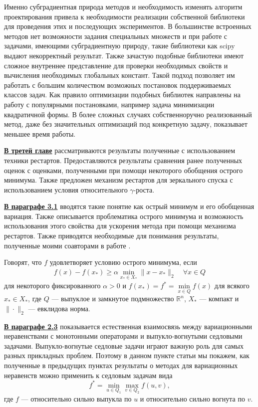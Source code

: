 Именно субградиентная природа методов и необходимость изменять алгоритм проектирования привела к необходимости реализации собственной библиотеки для проведения этих и последующих экспериментов. В большинстве встроенных методов нет возможности задания специальных  множеств и при работе с задачами, имеющими субградиентную природу, такие библиотеки как scipy выдают некорректный результат. Также зачастую подобные библиотеки имеют сложное внутреннее представление для проверки необходимых свойств и вычисления необходимых глобальных констант. Такой подход позволяет им работать с большим количеством возможных постановок поддерживаемых классов задач. Как правило оптимизации подобных библиотек направлены на работу с популярными постановками, например задача минимизации квадратичной формы. В более сложных случаях собственноручно реализованный метод, даже без значительных оптимизаций под конкретную задачу, показывает меньшее время работы. 


\underline{\textbf{В третей главе}} рассматриваются результаты полученные с использованием техники рестартов. Предоставляются результаты сравнения ранее полученных оценок с оценками, полученными при помощи некоторого обобщения острого минимума. Также предложен механизм рестартов для зеркального спуска с использованием условия относительного $\gamma$-роста. 

\underline{\textbf{В параграфе 3.1}} вводятся такие понятие как острый минимум и его обобщенная вариация. Также описывается проблематика острого минимума и возможность использования этого свойства для ускорения метода при помощи механизма рестартов. Также приводятся необходимые для понимания результаты, полученные моими соавторами в работе \cite{sharp22}. 

Говорят, что $f$ удовлетворяет условию острого минимума, если
\begin{gather}\label{sm}
    f(x) - f(x_*) \geq \alpha \min_{x_* \in X_*} \|x- x_*\|_2 \quad \forall x \in Q
\end{gather}
для некоторого фиксированного $\alpha >0$ и $f(x_*) = f^* = \min\limits_{x\in Q} f(x)$ для всякого $x_* \in X_*$, где $Q$ --- выпуклое и замкнутое подмножество $\mathbb{R}^n$, $X_*$ --- компакт и $\|\cdot\|_2$ --- евклидова норма. 

\underline{\textbf{В параграфе 2.3}} показывается естественная взаимосвязь между вариационными неравенствами с монотонными операторами и выпукло-вогнутыми седловыми задачами. Выпукло-вогнутые седловые задачи играют важную роль для самых разных прикладных проблем. Поэтому в данном пункте статьи мы покажем, как полученные в предыдущих пунктах результаты о методах для вариационных неравенств можно применить к седловым задачам вида
\begin{equation}\label{eqsedlo}
    f^* = \min_{u \in Q_1} \max_{v \in Q_2} f(u, v),
\end{equation}
где $f$ --- относительно сильно выпукла по $u$ и относительно сильно вогнута по $v$.

